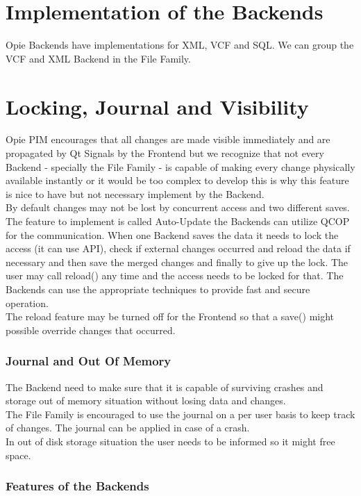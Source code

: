 \section{Implementation of the Backends}
Opie Backends have implementations for XML, VCF and SQL. We can
group the VCF and XML Backend in the File Family.

\section{Locking, Journal and Visibility}
Opie PIM encourages that all changes are made visible 
immediately and are propagated by Qt Signals by the Frontend
but we recognize that not every Backend
- specially the File Family - is capable of making every 
change physically available instantly or it would be too
complex to develop this is why this feature is nice to have
but not necessary implement by the Backend.\\
By default changes may not be lost by concurrent access and two different
saves. The feature to implement is called Auto-Update the Backends
can utilize QCOP for the communication. When one Backend saves the data
it needs to lock the access (it can use API), check if external changes
occurred and reload the data if necessary and then save the merged changes
and finally to give up the lock.
The user may call reload() any time and the access needs to be locked
for that. The Backends can use the appropriate techniques to provide
fast and secure operation.\\
The reload feature may be turned off for the Frontend so that a save()
might possible override changes that occurred.

\subsubsection{Journal and Out Of Memory}
The Backend need to make sure that it is capable of surviving crashes
and storage out of memory situation without losing data and changes.\\
The File Family is encouraged to use the journal on a per user basis 
to keep track of changes. The journal can be applied in case of a crash.\\
In out of disk storage situation the user needs to be informed so it might
free space.

\subsubsection{Features of the Backends}

